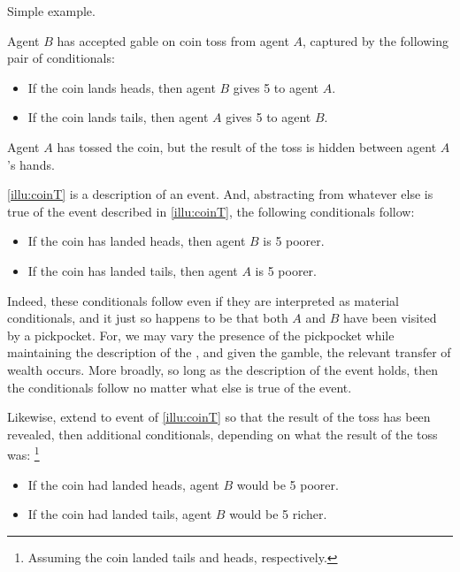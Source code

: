\begin{note}
  Simple example.

  \begin{illustration}
    \label{illu:coinT}
    Agent \(B\) has accepted gable on coin toss from agent \(A\), captured by the following pair of conditionals:
    \begin{itemize}[noitemsep]
    \item
      If the coin lands heads, then agent \(B\) gives \texteuro{}5 to agent \(A\).
    \item
      If the coin lands tails, then agent \(A\) gives \texteuro{}5 to agent \(B\).
    \end{itemize}

    Agent \(A\) has tossed the coin, but the result of the toss is hidden between agent \(A\)'s hands.
  \end{illustration}

  \autoref{illu:coinT} is a description of an event.
  And, abstracting from whatever else is true of the event described in \autoref{illu:coinT}, the following conditionals follow:

  \begin{itemize}[noitemsep]
  \item
    If the coin has landed heads, then agent \(B\) is \texteuro{}5 poorer.
  \item
    If the coin has landed tails, then agent \(A\) is \texteuro{}5 poorer.
  \end{itemize}

  Indeed, these conditionals follow even if they are interpreted as material conditionals, and it just so happens to be that both \(A\) and \(B\) have been visited by a pickpocket.
  For, we may vary the presence of the pickpocket while maintaining the description of the , and given the gamble, the relevant transfer of wealth occurs.
  More broadly, so long as the description of the event holds, then the conditionals follow no matter what else is true of the event.

  Likewise, extend to event of \autoref{illu:coinT} so that the result of the toss has been revealed, then additional conditionals, depending on what the result of the toss was:%
  \footnote{
    Assuming the coin landed tails and heads, respectively.
  }

  \begin{itemize}[noitemsep]
  \item
    If the coin had landed heads, agent \(B\) would be \texteuro{}5 poorer.
  \item
    If the coin had landed tails, agent \(B\) would be \texteuro{}5 richer.
  \end{itemize}


\end{note}
